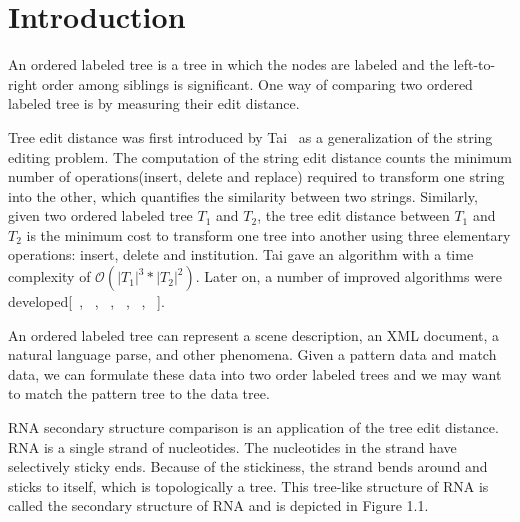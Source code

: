 \doublespacing
\chapter{Introduction}
An ordered labeled tree is a tree in which the nodes are labeled and the left-to-right order among siblings is significant. One way of comparing two ordered labeled tree is by measuring their edit distance. 

Tree edit distance was first introduced by Tai~\cite{tai1979tree} as a generalization of the string editing problem. The computation of the string edit distance counts the minimum number of operations(insert, delete and replace) required to transform one string into the other, which quantifies the similarity between two strings. Similarly, given two ordered labeled tree $T_1$ and $T_2$, the tree edit distance between $T_1$ and $T_2$ is the minimum cost to transform one tree into another using three elementary operations: insert, delete and institution. Tai gave an algorithm with a time complexity of $\mathcal{O}(\left\vert T_1 \right\vert^3 * \left\vert T_2 \right\vert^2)$. Later on, a number of improved algorithms were developed[~\cite{zhang1989simple}, ~\cite{klein1998computing}, ~\cite{dulucq2005decomposition}, ~\cite{demaine2009optimal}, ~\cite{Chen2014}, ~\cite{pawlik2015efficient}].

An ordered labeled tree can represent a scene description, an XML document, a natural language parse, and other phenomena. Given a pattern data and match data, we can formulate these data into two order labeled trees and we may want to match the pattern tree to the data tree.

RNA secondary structure comparison is an application of the tree edit distance. RNA is a single strand of nucleotides. The nucleotides in the strand have selectively sticky ends. Because of the stickiness, the strand bends around and sticks to itself, which is topologically a tree. This tree-like structure of RNA is called the secondary structure of RNA and is depicted in Figure 1.1. 

